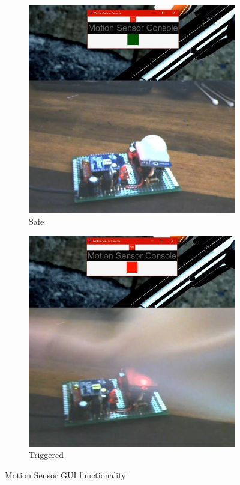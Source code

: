 		\begin{figure}[h]
			\centering
			\begin{subfigure}[t]{0.4\textwidth}
				\includegraphics[width=\textwidth]{motionOff.JPG}
				\caption{Safe}
			\end{subfigure}
			\begin{subfigure}[t]{0.4\textwidth}
				\includegraphics[width=\textwidth]{motionOn.JPG}
				\caption{Triggered}
			\end{subfigure}
			\caption{Motion Sensor GUI functionality}
			\label{fig:motionFunc}
		\end{figure}
		
